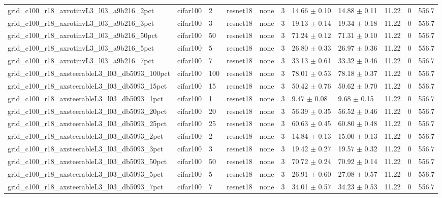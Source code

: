 \begin{tabular}{lllllllllll}
grid_c100_r18_axrotinvL3_l03_a9b216_2pct & cifar100 & 2 & resnet18 & none & 3 & 14.66 $\pm$ 0.10 & 14.88 $\pm$ 0.11 & 11.22 & 0 & 556.7 \\
grid_c100_r18_axrotinvL3_l03_a9b216_3pct & cifar100 & 3 & resnet18 & none & 3 & 19.13 $\pm$ 0.14 & 19.34 $\pm$ 0.18 & 11.22 & 0 & 556.7 \\
grid_c100_r18_axrotinvL3_l03_a9b216_50pct & cifar100 & 50 & resnet18 & none & 3 & 71.24 $\pm$ 0.12 & 71.31 $\pm$ 0.10 & 11.22 & 0 & 556.7 \\
grid_c100_r18_axrotinvL3_l03_a9b216_5pct & cifar100 & 5 & resnet18 & none & 3 & 26.80 $\pm$ 0.33 & 26.97 $\pm$ 0.36 & 11.22 & 0 & 556.7 \\
grid_c100_r18_axrotinvL3_l03_a9b216_7pct & cifar100 & 7 & resnet18 & none & 3 & 33.13 $\pm$ 0.61 & 33.32 $\pm$ 0.46 & 11.22 & 0 & 556.7 \\
grid_c100_r18_axsteerableL3_l03_db5093_100pct & cifar100 & 100 & resnet18 & none & 3 & 78.01 $\pm$ 0.53 & 78.18 $\pm$ 0.37 & 11.22 & 0 & 556.7 \\
grid_c100_r18_axsteerableL3_l03_db5093_15pct & cifar100 & 15 & resnet18 & none & 3 & 50.42 $\pm$ 0.76 & 50.62 $\pm$ 0.70 & 11.22 & 0 & 556.7 \\
grid_c100_r18_axsteerableL3_l03_db5093_1pct & cifar100 & 1 & resnet18 & none & 3 & 9.47 $\pm$ 0.08 & 9.68 $\pm$ 0.15 & 11.22 & 0 & 556.7 \\
grid_c100_r18_axsteerableL3_l03_db5093_20pct & cifar100 & 20 & resnet18 & none & 3 & 56.39 $\pm$ 0.35 & 56.52 $\pm$ 0.46 & 11.22 & 0 & 556.7 \\
grid_c100_r18_axsteerableL3_l03_db5093_25pct & cifar100 & 25 & resnet18 & none & 3 & 60.63 $\pm$ 0.45 & 60.80 $\pm$ 0.48 & 11.22 & 0 & 556.7 \\
grid_c100_r18_axsteerableL3_l03_db5093_2pct & cifar100 & 2 & resnet18 & none & 3 & 14.84 $\pm$ 0.13 & 15.00 $\pm$ 0.13 & 11.22 & 0 & 556.7 \\
grid_c100_r18_axsteerableL3_l03_db5093_3pct & cifar100 & 3 & resnet18 & none & 3 & 19.42 $\pm$ 0.27 & 19.57 $\pm$ 0.32 & 11.22 & 0 & 556.7 \\
grid_c100_r18_axsteerableL3_l03_db5093_50pct & cifar100 & 50 & resnet18 & none & 3 & 70.72 $\pm$ 0.24 & 70.92 $\pm$ 0.14 & 11.22 & 0 & 556.7 \\
grid_c100_r18_axsteerableL3_l03_db5093_5pct & cifar100 & 5 & resnet18 & none & 3 & 26.91 $\pm$ 0.60 & 27.08 $\pm$ 0.57 & 11.22 & 0 & 556.7 \\
grid_c100_r18_axsteerableL3_l03_db5093_7pct & cifar100 & 7 & resnet18 & none & 3 & 34.01 $\pm$ 0.57 & 34.23 $\pm$ 0.53 & 11.22 & 0 & 556.7 \\

\end{tabular}

